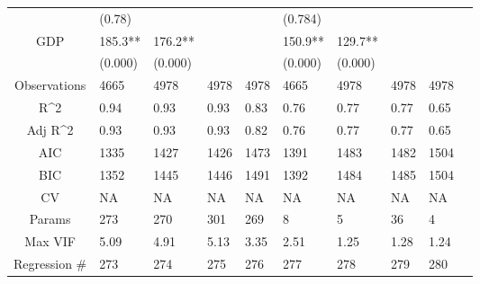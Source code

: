 \documentclass{article}
\begin{document}
\begin{table}[H]
\begin{tabular}{|clllllllll|}
   & (0.78) &  &  &  & (0.784) &  &  &  & \\ 
  GDP & 185.3** & 176.2** &  &  & 150.9** & 129.7** &  &  & \\ 
   & (0.000) & (0.000) &  &  & (0.000) & (0.000) &  &  & \\ 
  \hline 
 Observations & 4665 & 4978 & 4978 & 4978 & 4665 & 4978 & 4978 & 4978 & \\ 
  R^2 & 0.94 & 0.93 & 0.93 & 0.83 & 0.76 & 0.77 & 0.77 & 0.65 & \\ 
  Adj R^2 & 0.93 & 0.93 & 0.93 & 0.82 & 0.76 & 0.77 & 0.77 & 0.65 & \\ 
  AIC & 1335 & 1427 & 1426 & 1473 & 1391 & 1483 & 1482 & 1504 & \\ 
  BIC & 1352 & 1445 & 1446 & 1491 & 1392 & 1484 & 1485 & 1504 & \\ 
  CV & NA & NA & NA & NA & NA & NA & NA & NA & \\ 
  Params & 273 & 270 & 301 & 269 & 8 & 5 & 36 & 4 & \\ 
  Max VIF & 5.09 & 4.91 & 5.13 & 3.35 & 2.51 & 1.25 & 1.28 & 1.24 & \\ 
  Regression \# & 273 & 274 & 275 & 276 & 277 & 278 & 279 & 280 & \\ 
   \hline
\end{tabular}
 
\end{table}
\end{document}
